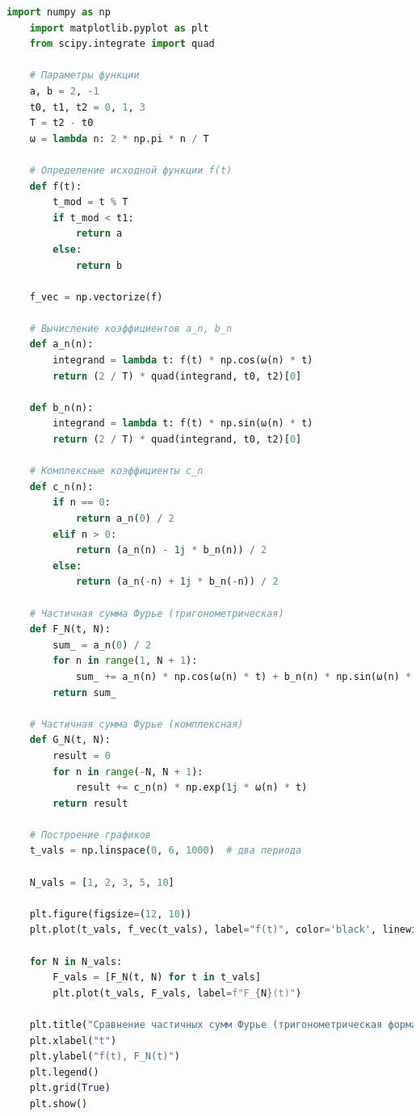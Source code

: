 \begin{lstlisting}[language=Python, caption=Вычисление и визуализация ряда Фурье для квадратной волны]
    import numpy as np
    import matplotlib.pyplot as plt
    from scipy.integrate import quad
    
    # Параметры функции
    a, b = 2, -1
    t0, t1, t2 = 0, 1, 3
    T = t2 - t0
    ω = lambda n: 2 * np.pi * n / T
    
    # Определение исходной функции f(t)
    def f(t):
        t_mod = t % T
        if t_mod < t1:
            return a
        else:
            return b
    
    f_vec = np.vectorize(f)
    
    # Вычисление коэффициентов a_n, b_n
    def a_n(n):
        integrand = lambda t: f(t) * np.cos(ω(n) * t)
        return (2 / T) * quad(integrand, t0, t2)[0]
    
    def b_n(n):
        integrand = lambda t: f(t) * np.sin(ω(n) * t)
        return (2 / T) * quad(integrand, t0, t2)[0]
    
    # Комплексные коэффициенты c_n
    def c_n(n):
        if n == 0:
            return a_n(0) / 2
        elif n > 0:
            return (a_n(n) - 1j * b_n(n)) / 2
        else:
            return (a_n(-n) + 1j * b_n(-n)) / 2
    
    # Частичная сумма Фурье (тригонометрическая)
    def F_N(t, N):
        sum_ = a_n(0) / 2
        for n in range(1, N + 1):
            sum_ += a_n(n) * np.cos(ω(n) * t) + b_n(n) * np.sin(ω(n) * t)
        return sum_
    
    # Частичная сумма Фурье (комплексная)
    def G_N(t, N):
        result = 0
        for n in range(-N, N + 1):
            result += c_n(n) * np.exp(1j * ω(n) * t)
        return result
    
    # Построение графиков
    t_vals = np.linspace(0, 6, 1000)  # два периода
    
    N_vals = [1, 2, 3, 5, 10]
    
    plt.figure(figsize=(12, 10))
    plt.plot(t_vals, f_vec(t_vals), label="f(t)", color='black', linewidth=2)
    
    for N in N_vals:
        F_vals = [F_N(t, N) for t in t_vals]
        plt.plot(t_vals, F_vals, label=f"F_{N}(t)")
    
    plt.title("Сравнение частичных сумм Фурье (тригонометрическая форма)")
    plt.xlabel("t")
    plt.ylabel("f(t), F_N(t)")
    plt.legend()
    plt.grid(True)
    plt.show()
    

\end{lstlisting}

